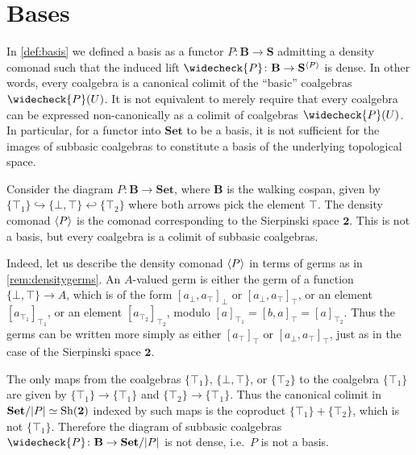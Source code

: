 \documentclass[11pt, oneside, article]{memoir}
\theoremstyle{plain}
\theoremstyle{definition}
\theoremstyle{remark}
\newenvironment{counterexample}
{\renewcommand\qedsymbol{$\lrcorner$}%
  \pushQED{\qed}\mycounterexample}
{\popQED\endmycounterexample}
\DeclareMathOperator{\Sh}{Sh}
\DeclarePairedDelimiter{\gen}{\langle}{\rangle}
\DeclarePairedDelimiter{\abs}{\lvert}{\rvert}
\newcommand{\namedcat}[1]{\mathbf{#1}}
\newcommand{\cat}[1]{\mathbf{#1}}
\newcommand{\Set}{\namedcat{Set}}
\newcommand{\CoalgOn}[2]{{#2}^{#1}}
\newcommand{\CoalgS}[1]{\CoalgOn{#1}{\bS}}
\newcommand{\pts}[1]{{\abs{#1}}}
\newcommand{\lift}[1]{\widecheck{#1}}
\newcommand{\arro}{\mathbf{2}}
\newcommand{\sier}{\arro}
\newcommand{\ph}[1]{#1}
\newcommand{\setof}[1]{\{#1\}}
\newcommand{\xA}{A}
\newcommand{\xU}{U}
\newcommand{\bB}{\cat{B}}
\newcommand{\bS}{\cat{S}}
\newcommand{\pP}{\ph{P}}
\newcommand{\cP}{\gen{\pP}}
\newcommand{\lP}{\lift{\pP}}
\newcommand{\PS}{\CoalgS{\cP}}
\newcommand{\SetP}{\Set/\pts{\pP}}
\begin{document}
\section*{Bases}

In \cref{def:basis} we defined a basis as a functor
$\pP \colon \bB \to \bS$ admitting a density comonad such that the
induced lift $\lP \colon \bB \to \PS$ is dense. In other words, every
coalgebra is a canonical colimit of the ``basic'' coalgebras
$\lP(\xU)$.  It is not equivalent to merely require that every
coalgebra can be expressed non-canonically as a colimit of coalgebras
$\lP(\xU)$. In particular, for a functor into $\Set$ to be a basis, it
is not sufficient for the images of subbasic coalgebras to constitute
a basis of the underlying topological space.

\begin{counterexample}[Basis-like non-basis I]\label{cex:colimitsubbasis}
  Consider the diagram $\pP \colon \bB \to \Set$, where $\bB$ is the
  walking cospan, given by
  $\setof{\top_1} \hookrightarrow \setof{\bot, \top} \hookleftarrow
  \setof{\top_2}$ where both arrows pick the element $\top$. The
  density comonad $\cP$ is the comonad corresponding to the Sierpinski
  space $\sier$. This is not a basis, but every coalgebra is a colimit
  of subbasic coalgebras.

  Indeed, let us describe the density comonad $\cP$ in terms of germs
  as in \cref{rem:densitygerms}. An $\xA$-valued germ is either the
  germ of a function $\setof{\bot, \top} \to \xA$, which is of the form
  $[a_{\bot}, a_{\top}]_\bot$ or $[a_{\bot}, a_{\top}]_\top$, or an
  element $[a_{\top_1}]_{\top_1}$, or an element
  $[a_{\top_2}]_{\top_2}$, modulo
  $[a]_{\top_1} = [b, a]_\top = [a]_{\top_2}$. Thus the germs can
  be written more simply as either $[a_{\top}]_\top$ or
  $[a_{\bot}, a_{\top}]_\top$, just as in the case of the Sierpinski
  space $\sier$.

  The only maps from the coalgebras $\setof{\top_1}$,
  $\setof{\bot, \top}$, or $\setof{\top_2}$ to the coalgebra
  $\setof{\top_1}$ are given by $\setof{\top_1} \to \setof{\top_1}$
  and $\setof{\top_2} \to \setof{\top_1}$. Thus the canonical colimit in
  $\SetP \simeq \Sh(\sier)$ indexed by such maps is the coproduct
  $\setof{\top_1} + \setof{\top_2}$, which is not
  $\setof{\top_1}$. Therefore the diagram of subbasic coalgebras
  $\lP \colon \bB \to \SetP$ is not dense, i.e.\ $\pP$ is not a basis.
\end{counterexample}
\end{document}
